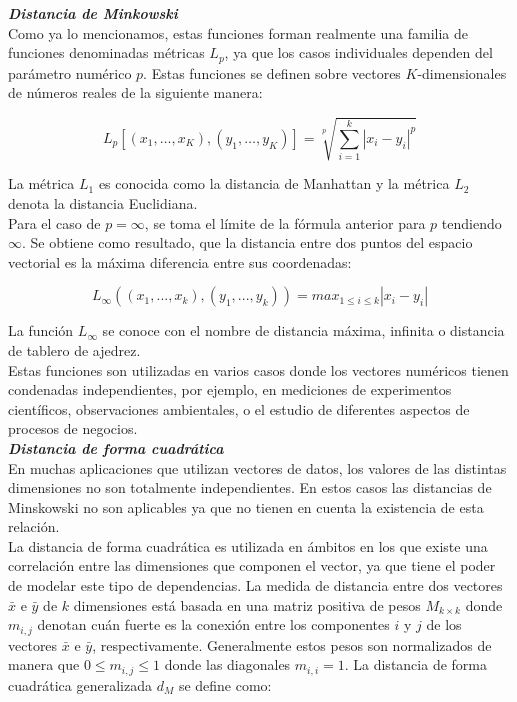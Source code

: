\noindent \textbf{\textit{Distancia de Minkowski}} \\

Como ya lo mencionamos, estas funciones forman realmente una familia de funciones denominadas m\'etricas $L_p$, ya que los casos individuales dependen del par\'ametro num\'erico $p$. Estas funciones se definen sobre vectores $K$-dimensionales de n\'umeros reales de la siguiente manera:

\[
L_p[(x_1,\ldots,x_K),(y_1,\ldots,y_K)] = \sqrt[p]{ \sum_{i=1}^k|x_i - y_i|^p}
\]

La m\'etrica $L_1$ es conocida como la distancia de Manhattan y la m\'etrica $L_2$ denota la distancia Euclidiana.\\

Para el caso de $p=\infty$, se toma el l\'imite de la f\'ormula anterior para $p$ tendiendo $\infty$. Se obtiene como resultado, que la distancia entre dos puntos del espacio vectorial es la m\'axima diferencia entre sus coordenadas:

\[
L_{\infty}((x_1,...,x_k), (y_1,...,y_k)) = max_{1 \leq i \leq k} |x_i - y_i |
\]

La funci\'on $L_{\infty}$ se conoce con el nombre de  distancia m\'axima, infinita o distancia de tablero de ajedrez.\\

Estas funciones son utilizadas en varios casos donde los vectores num\'ericos tienen condenadas independientes, por ejemplo, en mediciones de experimentos cient\'ificos, observaciones ambientales, o el estudio de diferentes aspectos de procesos de negocios.\\

\noindent \textbf{\textit{Distancia de  forma cuadr\'atica}}\\

En muchas aplicaciones que utilizan vectores de datos, los valores de las distintas dimensiones no son totalmente independientes. En estos casos las distancias de Minskowski no son aplicables ya que no tienen en cuenta la existencia de esta relaci\'on.\\

La distancia de forma cuadr\'atica  es utilizada en \'ambitos en los que existe una correlaci\'on entre  las dimensiones que componen el vector, ya que tiene el poder de modelar este tipo de  dependencias. La medida de distancia entre dos vectores $\bar{x}$ e $\bar{y}$  de $k$ dimensiones est\'a basada en una matriz positiva de pesos   $M_{k \times k}$ donde $m_{i,j}$  denotan cu\'an fuerte es la conexi\'on entre los componentes $i$ y $j$ de los vectores $\bar{x}$ e $\bar{y}$, respectivamente. Generalmente estos pesos son normalizados de manera que $0\leq m_{i,j} \leq 1$ donde las diagonales $m_{i,	i} = 1$. La distancia de forma  cuadr\'atica generalizada $d_M$ se define como:

